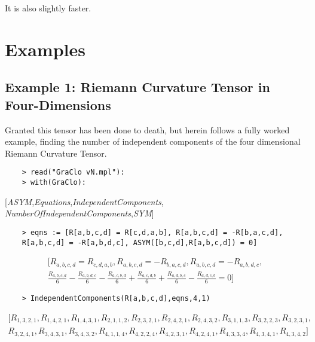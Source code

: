 \documentclass{article}
\begin{document}
It is also slightly faster.

\section*{Examples}
\subsection*{Example 1: Riemann Curvature Tensor in Four-Dimensions}
Granted this tensor has been done to death, but herein follows a fully worked example, finding the number of independent components of the four dimensional Riemann Curvature Tensor. 

\begin{verbatim}
    > read("GraClo vN.mpl"):
    > with(GraClo):
\end{verbatim}
[{\it ASYM},{\it Equations},{\it IndependentComponents},{\it 
NumberOfIndependentComponents},{\it SYM}]
\begin{verbatim}
    > eqns := [R[a,b,c,d] = R[c,d,a,b], R[a,b,c,d] = -R[b,a,c,d],
    R[a,b,c,d] = -R[a,b,d,c], ASYM([b,c,d],R[a,b,c,d]) = 0]
\end{verbatim}
\begin{equation*}
\begin{split}
[R_{{a,b,c,d}}=R_{{c,d,a,b}},R_{{a,b,c,d}}=-R_{{b,a,c,d}},R_{{a,b,c,d}
}=-R_{{a,b,d,c}},\\{\frac {R_{{a,b,c,d}}}{6}}-{\frac {R_{{a,b,d,c}}}{6}}
-{\frac {R_{{a,c,b,d}}}{6}}+{\frac {R_{{a,c,d,b}}}{6}}+{\frac {R_{{a,d
,b,c}}}{6}}-{\frac {R_{{a,d,c,b}}}{6}}=0]    \end{split}
\end{equation*}
\begin{verbatim}
    > IndependentComponents(R[a,b,c,d],eqns,4,1)
\end{verbatim}
\begin{equation*}
    \begin{split}
[R_{{1,3,2,1}},R_{{1,4,2,1}},R_{{1,4,3,1}},R_{{2,1,1,2}},R_{{2,3,2,1}}
,R_{{2,4,2,1}},R_{{2,4,3,2}},R_{{3,1,1,3}},R_{{3,2,2,3}},R_{{3,2,3,1}}
,\\R_{{3,2,4,1}},R_{{3,4,3,1}},R_{{3,4,3,2}},R_{{4,1,1,4}},R_{{4,2,2,4}}
,R_{{4,2,3,1}},R_{{4,2,4,1}},R_{{4,3,3,4}},R_{{4,3,4,1}},R_{{4,3,4,2}}
]
\end{split}
\end{equation*}
\end{document}
